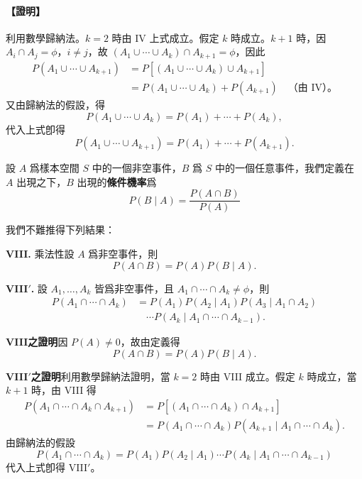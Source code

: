 \medskip
\paragraph{【證明】}
利用數學歸納法。$k=2$ 時由 IV 上式成立。假定 $k$ 時成立。$k+1$ 時，因 $A_i \cap A_j = \phi$，$i \ne j$，故 $(A_1 \cup \cdots \cup A_k) \cap A_{k+1} = \phi$，因此
\begin{align*}
P(A_1 \cup \cdots \cup A_{k+1}) &= P[(A_1 \cup \cdots \cup A_k) \cup A_{k+1}] \\
&= P(A_1 \cup \cdots \cup A_k) + P(A_{k+1}) \quad \text{（由 IV）。}
\end{align*}
又由歸納法的假設，得
\[
P(A_1 \cup \cdots \cup A_k) = P(A_1) + \cdots + P(A_k),
\]
代入上式卽得
\[
P(A_1 \cup \cdots \cup A_{k+1}) = P(A_1) + \cdots + P(A_{k+1}). \tag*{\#}
\]

\medskip
\begin{definition*}
設 $A$ 爲樣本空間 $S$ 中的一個非空事件，$B$ 爲 $S$ 中的一個任意事件，我們定義在 $A$ 出現之下，$B$ 出現的\textbf{條件機率}爲
\[
P(B \mid A) = \frac{P(A \cap B)}{P(A)}
\]
\end{definition*}
我們不難推得下列結果：

\medskip
\noindent\textbf{VIII.} 乘法性\quad 設 $A$ 爲非空事件，則
\[
P(A \cap B) = P(A) P(B \mid A).
\]

\medskip
\noindent\textbf{VIII$'$.} 設 $A_1, \dots, A_k$ 皆爲非空事件，且 $A_1 \cap \cdots \cap A_k \ne \phi$，則
\begin{align*}
P(A_1 \cap \cdots \cap A_k) &= P(A_1) P(A_2 \mid A_1) P(A_3 \mid A_1 \cap A_2) \\
&\quad \cdots P(A_k \mid A_1 \cap \cdots \cap A_{k-1}).
\end{align*}

\medskip
\noindent\textbf{VIII之證明}\quad 因 $P(A) \ne 0$，故由定義得
\[
P(A \cap B) = P(A) P(B \mid A). \tag*{\#}
\]

\medskip
\noindent\textbf{VIII$'$之證明}\quad 利用數學歸納法證明，當 $k=2$ 時由 VIII 成立。假定 $k$ 時成立，當 $k+1$ 時，由 VIII 得
\begin{align*}
P(A_1 \cap \cdots \cap A_k \cap A_{k+1}) &= P[(A_1 \cap \cdots \cap A_k) \cap A_{k+1}] \\
&= P(A_1 \cap \cdots \cap A_k) P(A_{k+1} \mid A_1 \cap \cdots \cap A_k).
\end{align*}
由歸納法的假設
\[
P(A_1 \cap \cdots \cap A_k) = P(A_1) P(A_2 \mid A_1) \cdots P(A_k \mid A_1 \cap \cdots \cap A_{k-1})
\]
代入上式卽得 VIII$'$。

